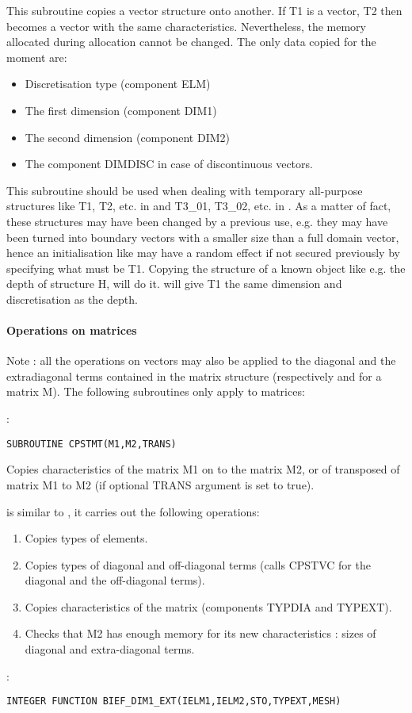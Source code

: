This subroutine copies a vector structure onto another. If  T1 is a vector, T2
then becomes a vector with the same characteristics. Nevertheless, the memory
allocated during allocation cannot be changed. The only data copied for the
moment are:
\begin{itemize}
  \item Discretisation type (component ELM)
  \item The first dimension (component DIM1)
  \item The second dimension (component DIM2)
  \item The component DIMDISC in case of discontinuous vectors.
\end{itemize}

This subroutine should be used when dealing with temporary all-purpose
 structures like T1, T2, etc. in  and T3\_01,
T3\_02, etc. in . As a matter of fact, these structures may have
been changed by a previous use, e.g. they may have been turned into boundary
vectors with a smaller size than a full domain vector, hence an initialisation
like  may have a random effect if not secured
previously by specifying what must be T1. Copying the structure of a known 
object like e.g. the depth of structure H, will do it.  will give T1 the same dimension and discretisation as the depth.

\paragraph{Operations on matrices}

Note : all the operations on vectors may also be applied to the diagonal and
the extradiagonal terms contained in the matrix structure (respectively
 and  for a matrix M). The following subroutines only
 apply to matrices:

:
\begin{lstlisting}[language=TelFortran]
SUBROUTINE CPSTMT(M1,M2,TRANS)
\end{lstlisting}

Copies characteristics of the matrix M1 on to the matrix M2, or of transposed
of matrix M1 to M2 (if optional TRANS argument is set to true).

 is similar to , it carries out the following
operations:
\begin{enumerate}
  \item Copies types of elements.
  \item Copies types of diagonal and off-diagonal terms (calls CPSTVC for the
    diagonal and the off-diagonal terms).
  \item Copies characteristics of the matrix (components TYPDIA and TYPEXT).
  \item Checks that M2 has enough memory for its new characteristics : sizes of
    diagonal and extra-diagonal terms.
\end{enumerate}
:
\begin{lstlisting}[language=TelFortran]
INTEGER FUNCTION BIEF_DIM1_EXT(IELM1,IELM2,STO,TYPEXT,MESH)
\end{lstlisting}

